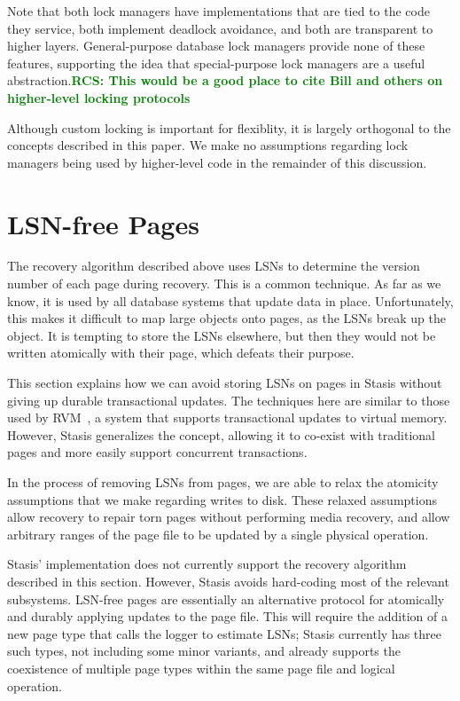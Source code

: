 \documentclass[letterpaper,twocolumn,10pt]{article}
\newcommand{\yad}{Stasis\xspace}
\newcommand{\yads}{Stasis'\xspace}
\newcommand{\rcs}[1]{\textcolor{green}{\bf RCS: #1}}
\begin{document}
Note that both lock managers have implementations that are tied to the
code they service, both implement deadlock avoidance, and both are
transparent to higher layers.  General-purpose database lock managers
provide none of these features, supporting the idea that
special-purpose lock managers are a useful abstraction.\rcs{This would
be a good place to cite Bill and others on higher-level locking
protocols}

Although custom locking is important for flexiblity, it is largely
orthogonal to the concepts described in this paper.  We make no
assumptions regarding lock managers being used by higher-level code in
the remainder of this discussion.



\section{LSN-free Pages}
\label{sec:lsn-free}

The recovery algorithm described above uses LSNs to determine the
version number of each page during recovery.  This is a common
technique.  As far as we know, it is used by all database systems that
update data in place.  Unfortunately, this makes it difficult to map
large objects onto pages, as the LSNs break up the object.  It
is tempting to store the LSNs elsewhere, but then they would not be
written atomically with their page, which defeats their purpose.

This section explains how we can avoid storing LSNs on pages in \yad
without giving up durable transactional updates.  The techniques here
are similar to those used by RVM~\cite{lrvm}, a system that supports
transactional updates to virtual memory.  However, \yad generalizes
the concept, allowing it to co-exist with traditional pages and more easily
support concurrent transactions.

In the process of removing LSNs from pages, we
are able to relax the atomicity assumptions that we make regarding
writes to disk.  These relaxed assumptions allow recovery to repair
torn pages without performing media recovery, and allow arbitrary
ranges of the page file to be updated by a single physical operation.

\yads implementation does not currently support the recovery algorithm
described in this section.  However, \yad avoids hard-coding most of
the relevant subsystems.  LSN-free pages are essentially an
alternative protocol for atomically and durably applying updates to
the page file.  This will require the addition of a new page type that
calls the logger to estimate LSNs; \yad currently has three such
types, not including some minor variants, and already supports the
coexistence of multiple page types within the same page file and
logical operation.
\end{document}
